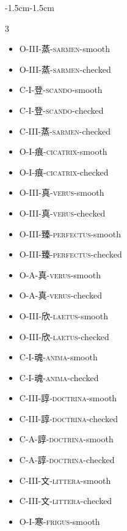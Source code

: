 \begin{adjustwidth}{-1.5cm}{-1.5cm}
\begin{multicols}{3}
\begin{itemize}[label={}, leftmargin=*]
  \item O-III-蒸-\textsc{sarmen}-smooth \hfill {}
  \item O-III-蒸-\textsc{sarmen}-checked \hfill {}
  \item C-I-登-\textsc{scando}-smooth \hfill {}
  \item C-I-登-\textsc{scando}-checked \hfill {}

  \item C-III-蒸-\textsc{sarmen}-checked \hfill {}
  \item O-I-痕-\textsc{cicatrix}-smooth \hfill {}
  \item O-I-痕-\textsc{cicatrix}-checked \hfill {}
  \item O-III-真-\textsc{verus}-smooth \hfill {}

  \item O-III-真-\textsc{verus}-checked \hfill {}
  \item O-III-臻-\textsc{perfectus}-smooth \hfill {}
  \item O-III-臻-\textsc{perfectus}-checked \hfill {}
  \item O-A-真-\textsc{verus}-smooth \hfill {}

  \item O-A-真-\textsc{verus}-checked \hfill {}
  \item O-III-欣-\textsc{laetus}-smooth \hfill {}
  \item O-III-欣-\textsc{laetus}-checked \hfill {}
  \item C-I-魂-\textsc{anima}-smooth \hfill {}

  \item C-I-魂-\textsc{anima}-checked \hfill {}
  \item C-III-諄-\textsc{doctrina}-smooth \hfill {}
  \item C-III-諄-\textsc{doctrina}-checked \hfill {}
  \item C-A-諄-\textsc{doctrina}-smooth \hfill {}

  \item C-A-諄-\textsc{doctrina}-checked \hfill {}
  \item C-III-文-\textsc{littera}-smooth \hfill {}
  \item C-III-文-\textsc{littera}-checked \hfill {}
  \item O-I-寒-\textsc{frigus}-smooth \hfill {}


\end{itemize}
\end{multicols}
\end{adjustwidth}

